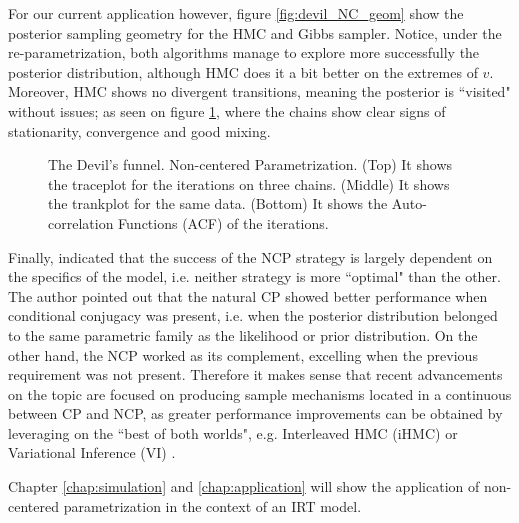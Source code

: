 For our current application however, figure \ref{fig:devil_NC_geom} show the posterior sampling geometry for the HMC and Gibbs sampler. Notice, under the re-parametrization, both algorithms manage to explore more successfully the posterior distribution, although HMC does it a bit better on the extremes of $v$. Moreover, HMC shows no divergent transitions, meaning the posterior is ``visited" without issues; as seen on figure \ref{fig:devil_NC}, where the chains show clear signs of stationarity, convergence and good mixing.

%
\begin{figure}[h]
	\centering
	\begin{subfigure}
		\texttt{[image: 3\_trace\_NC]}
	\end{subfigure}
	\begin{subfigure}
		\texttt{[image: 3\_trank\_NC]}
	\end{subfigure}
	\begin{subfigure}
		\texttt{[image: 3\_acf\_NC]}
	\end{subfigure}
	\caption[The Devil's funnel. Non-centered Parametrization.]%
	{The Devil's funnel. Non-centered Parametrization. (Top) It shows the traceplot for the iterations on three chains. (Middle) It shows the trankplot for the same data. (Bottom) It shows the Auto-correlation Functions (ACF) of the iterations.}
	\label{fig:devil_NC}
\end{figure}

Finally, \citet{Papaspiliopoulos_et_al_2007} indicated that the success of the NCP strategy is largely dependent on the specifics of the model, i.e. neither strategy is more ``optimal" than the other. The author pointed out that the natural CP showed better performance when conditional conjugacy was present, i.e. when the posterior distribution belonged to the same parametric family as the likelihood or prior distribution. On the other hand, the NCP worked as its complement, excelling when the previous requirement was not present. Therefore it makes sense that recent advancements on the topic are focused on producing sample mechanisms located in a continuous between CP and NCP, as greater performance improvements can be obtained by leveraging on the ``best of both worlds", e.g. Interleaved HMC (iHMC) or Variational Inference (VI) \cite{Gelfand_et_al_1995, Gelfand_et_al_1996, Papaspiliopoulos_et_al_2003, Papaspiliopoulos_et_al_2007, Gorinova_et_al_2019}.

Chapter \ref{chap:simulation} and \ref{chap:application} will show the application of non-centered parametrization in the context of an IRT model.
